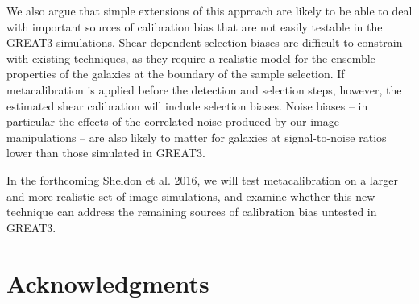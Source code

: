 \documentclass[iop]{emulateapj}
\begin{document}
We also argue that simple extensions of this approach are likely to be
able to deal with important sources of calibration bias that are not
easily testable in the GREAT3 simulations. Shear-dependent selection
biases are difficult to constrain with existing techniques, as they
require a realistic model for the ensemble properties of the galaxies
at the boundary of the sample selection. If metacalibration is applied
before the detection and selection steps, however, the estimated shear
calibration will include selection biases. Noise biases -- in
particular the effects of the correlated noise produced by our image
manipulations -- are also likely to matter for galaxies at
signal-to-noise ratios lower than those simulated in GREAT3.

In the forthcoming Sheldon et al. 2016, we will test metacalibration
on a larger and more realistic set of image simulations, and examine
whether this new technique can address the remaining sources of
calibration bias untested in GREAT3.




\section*{Acknowledgments}




\end{document}

